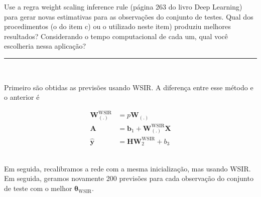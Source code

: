 \documentclass[
  a4paperpaper,
]{article}
\begin{document}
Use a regra weight scaling inference rule (página 263 do livro Deep
Learning) para gerar novas estimativas para as observações do conjunto
de testes. Qual dos procedimentos (o do item c) ou o utilizado neste
item) produziu melhores resultados? Considerando o tempo computacional
de cada um, qual você escolheria nessa aplicação?

\begin{center}\rule{0.5\linewidth}{0.5pt}\end{center}

~

Primeiro são obtidas as previsões usando WSIR. A diferença entre esse
método e o anterior é

\[
\begin{aligned}
  \mathbf{W}_{(.)}^{\text{WSIR}} &= p \mathbf{W}_{(.)} \\
  \mathbf{A} &= \mathbf{b}_1 + \mathbf{W}_{(.)}^{\text{WSIR}} \mathbf{X} \\
  \mathbf{\hat{y}} &= \mathbf{H} \mathbf{W}_2^{\text{WSIR}} + b_3
\end{aligned}
\] ~

Em seguida, recalibramos a rede com a mesma inicialização, mas usando
WSIR. Em seguida, geramos novamente 200 previsões para cada observação
do conjunto de teste com o melhor \(\boldsymbol{\theta}_{\text{WSIR}}\).

~
\end{document}
